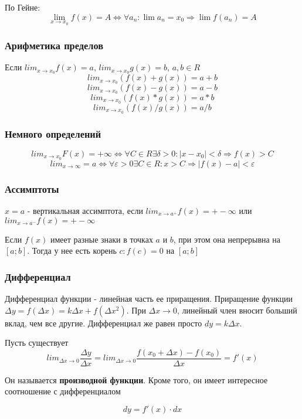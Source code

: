 \documentclass{article}
\begin{document}
По Гейне: 
$$\lim_{x\to x_0} f(x) = A \Leftrightarrow \forall {a_n}: \lim a_n=x_0 \Rightarrow \lim f(a_n) = A $$


\subsubsection{Арифметика пределов}
Если $lim_{x\to x_0} f(x) = a$, $lim_{x\to x_0} g(x) = b$, $a,b \in R$
$$lim _{x\to x_0}(f(x)+g(x)) = a+b$$
$$lim _{x\to x_0}(f(x)-g(x)) = a-b$$
$$lim _{x\to x_0}(f(x)*g(x)) = a*b$$
$$lim _{x\to x_0}(f(x)/g(x)) = a/b$$

\subsubsection{Немного определений}

$$lim _{x\to x_0} F(x) = + \infty \Leftrightarrow \forall C \in R \exists \delta>0:|x-x_0|<\delta \Rightarrow f(x)>C$$
$$lim _{x\to \infty} = a \Leftrightarrow \forall \varepsilon>0 \exists C\in R: x>C \Rightarrow |f(x)-a|<\varepsilon$$

\subsubsection{Ассимптоты}

$x=a$ - вертикальная ассимптота, если $lim_{x\to a^+} f(x)=+-\infty$ или $lim_{x\to a^-} f(x)=+-\infty$

Если $f(x)$ имеет разные знаки в точках $a$ и $b$, при этом она непрерывна на $[a;b]$. Тогда у нее есть корень $c: f(c)=0$ на $[a;b]$



\subsubsection{Дифференциал}
Дифференциал функции - линейная часть ее приращения. Приращение функции $\Delta y = f(\Delta x) = k \Delta x + f(\Delta x^2)$. При $\Delta x \to 0$, линейный член вносит больший вклад, чем все другие. Дифференциал же равен просто $dy =k\Delta x$.

Пусть существует $$lim_{\Delta x \to 0}\frac{\Delta y}{\Delta x} = lim_{\Delta x \to 0}\frac{f(x_0 + \Delta x) - f(x_0)}{\Delta x} =f'(x)$$

Он называется \textbf{производной функции}. Кроме того, он имеет интересное соотношение с дифференциалом

$$dy = f'(x)\cdot dx$$
\end{document}
